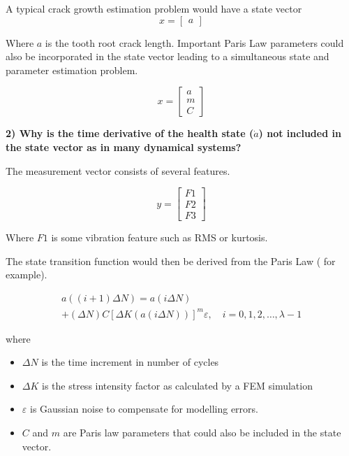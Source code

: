 A typical crack growth estimation problem would have a state vector
\begin{equation}
x =	\left[\begin{array}{l}
	a
	\end{array}\right]
\end{equation}

Where $a$ is the tooth root crack length. Important Paris Law parameters could also be incorporated in the state vector leading to a simultaneous state and parameter estimation problem.

\begin{equation}
 x = \left[\begin{array}{l}
a \\
m\\
C
\end{array}\right]
\end{equation}

\textbf{2) Why is the time derivative of the health state ($\dot{a}$) not included in the state vector as in many dynamical systems?} 

The measurement vector consists of several features.

\begin{equation}
y =	\left[\begin{array}{l}
F1 \\
F2 \\
F3
\end{array}\right]
\end{equation}

Where $F1$ is some vibration feature such as RMS or kurtosis.


The state transition function would then be derived from the Paris Law (\cite{Zhao2013} for example).

\begin{equation}
\begin{array}{l}
a((i+1) \Delta N)=a(i \Delta N) \\
+(\Delta N) C[\Delta K(a(i \Delta N))]^{m} \varepsilon, \quad i=0,1,2, \ldots, \lambda-1
\end{array}
\end{equation}

where 

\begin{itemize}
	\item $\Delta N$ is the time increment in number of cycles
	\item $\Delta K$ is the stress intensity factor as calculated by a FEM simulation
	\item $\varepsilon$ is Gaussian noise to compensate for modelling errors. 
	\item $C$ and $m$ are Paris law parameters that could also be included in the state vector. 
\end{itemize}




